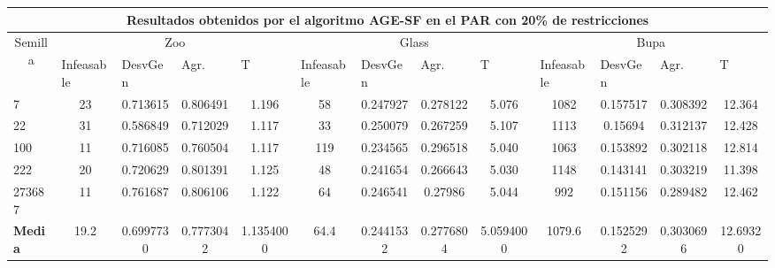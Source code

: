 \begin{table}[H]
	\tiny

	\begin{adjustwidth}{-1cm}{-1cm}%
	
	\begin{tabular}{|l|c|c|c|c|c|c|c|c|c|c|c|c|}
	\hline
	\multicolumn{13}{|c|}{\textbf{Resultados obtenidos por el algoritmo AGE-SF en el PAR con 20\% de restricciones}}                                                                                                                                                                                                                                                                                                                                            \\ \hline
	\multicolumn{1}{|c|}{\multirow{2}{*}{Semilla}} & \multicolumn{4}{c|}{Zoo}                                                                                          & \multicolumn{4}{c|}{Glass}                                                                                         & \multicolumn{4}{c|}{Bupa}                                                                                          \\ \cline{2-13} 
	\multicolumn{1}{|c|}{}                                  & \multicolumn{1}{l|}{Infeasable} & \multicolumn{1}{l|}{DesvGen} & \multicolumn{1}{l|}{Agr.} & \multicolumn{1}{l|}{T} & \multicolumn{1}{l|}{Infeasable} & \multicolumn{1}{l|}{DesvGen} & \multicolumn{1}{l|}{Agr.} & \multicolumn{1}{l|}{T} & \multicolumn{1}{l|}{Infeasable} & \multicolumn{1}{l|}{DesvGen} & \multicolumn{1}{l|}{Agr.} & \multicolumn{1}{l|}{T} \\ \hline
	7   	& 23 & 0.713615 & 0.806491 & 1.196 &				58 & 0.247927 & 0.278122 & 5.076 &			 	1082 & 0.157517 & 0.308392 &  12.364		\\ \hline
	22 		& 31 & 0.586849 & 0.712029 &	1.117 &				33 & 0.250079 & 0.267259 &	5.107 &		 	1113 & 0.15694 & 0.312137 & 12.428		\\ \hline
	100 	& 11 & 0.716085 & 0.760504 &	1.117 &				119 & 0.234565 & 0.296518 & 5.040 &				1063 & 0.153892 & 0.302118 &	12.814		\\ \hline
	222 	& 20 & 0.720629 & 0.801391 &	1.125 &				48 & 0.241654 & 0.266643 &	5.030 & 			1148 & 0.143141 & 0.303219 & 11.398			\\ \hline
	273687 	& 11 & 0.761687 & 0.806106 &	1.122 &				64 & 0.246541 & 0.27986 &	5.044 &			992 & 0.151156 & 0.289482 &	12.462		\\ \hline
	\textbf{Media} &  19.2 & 	0.6997730	 & 0.7773042 & 	1.1354000 & 	64.4	 & 0.2441532 & 	0.2776804 & 	5.0594000 & 	1079.6 & 	0.1525292 & 	0.3030696 & 	12.69320 \\ \hline
	\end{tabular}
	
	\end{adjustwidth}
	
\end{table}

